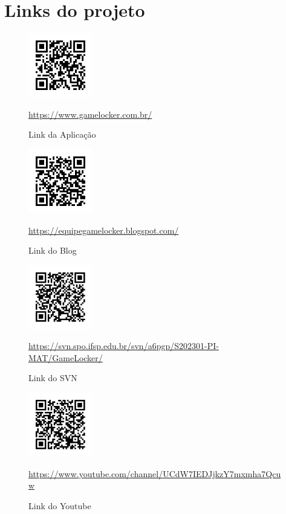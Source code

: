 \chapter{Links do projeto}\label{LinksProjeto}

\begin{figure}[H]
	\centering
	\includegraphics[width=0.25\textwidth]{imagens/links/aplicacaoQRCode.png}
	\caption{Link da Aplicação}
    \url{https://www.gamelocker.com.br/}
\end{figure}

\begin{figure}[H]
	\centering
	\includegraphics[width=0.25\textwidth]{imagens/links/blogQRCode.png}
	\caption{Link do Blog}
    \url{https://equipegamelocker.blogspot.com/}
\end{figure}

\begin{figure}[H]
	\centering
	\includegraphics[width=0.25\textwidth]{imagens/links/svnQRCode.png}
	\caption{Link do SVN}
    \url{https://svn.spo.ifsp.edu.br/svn/a6pgp/S202301-PI-MAT/GameLocker/}
\end{figure}

\begin{figure}[H]
	\centering
	\includegraphics[width=0.25\textwidth]{imagens/links/youtubeQRCode.png}
	\caption{Link do Youtube}
    \url{https://www.youtube.com/channel/UCdW7IEDJjkzY7mxmha7Qcuw}
\end{figure}

